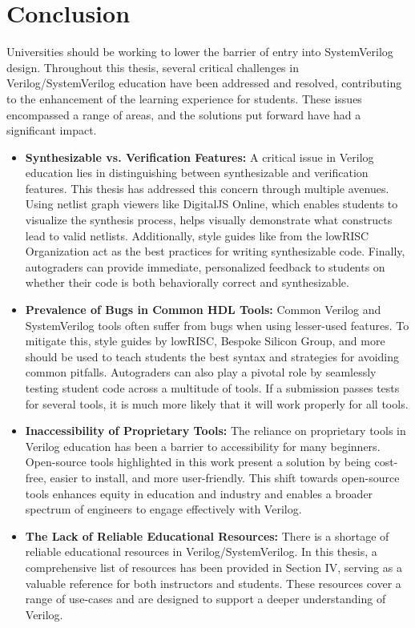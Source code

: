 
\chapter{Conclusion}
\label{chapter:Conclusion}

Universities should be working to lower the barrier of entry into SystemVerilog design. Throughout this thesis, several critical challenges in Verilog/SystemVerilog education have been addressed and resolved, contributing to the enhancement of the learning experience for students. These issues encompassed a range of areas, and the solutions put forward have had a significant impact.

\begin{itemize}
    \item \textbf{Synthesizable vs. Verification Features:} A critical issue in Verilog education lies in distinguishing between synthesizable and verification features. This thesis has addressed this concern through multiple avenues. Using netlist graph viewers like DigitalJS Online, which enables students to visualize the synthesis process, helps visually demonstrate what constructs lead to valid netlists. Additionally, style guides like from the lowRISC Organization act as the best practices for writing synthesizable code. Finally, autograders can provide immediate, personalized feedback to students on whether their code is both behaviorally correct and synthesizable.
    \item \textbf{Prevalence of Bugs in Common HDL Tools:} Common Verilog and SystemVerilog tools often suffer from bugs when using lesser-used features. To mitigate this, style guides by lowRISC, Bespoke Silicon Group, and more should be used to teach students the best syntax and strategies for avoiding common pitfalls. Autograders can also play a pivotal role by seamlessly testing student code across a multitude of tools. If a submission passes tests for several tools, it is much more likely that it will work properly for all tools.
    \item \textbf{Inaccessibility of Proprietary Tools:} The reliance on proprietary tools in Verilog education has been a barrier to accessibility for many beginners. Open-source tools highlighted in this work present a solution by being cost-free, easier to install, and more user-friendly. This shift towards open-source tools enhances equity in education and industry and enables a broader spectrum of engineers to engage effectively with Verilog.
    \item \textbf{The Lack of Reliable Educational Resources:} There is a shortage of reliable educational resources in Verilog/SystemVerilog. In this thesis, a comprehensive list of resources has been provided in Section IV, serving as a valuable reference for both instructors and students. These resources cover a range of use-cases and are designed to support a deeper understanding of Verilog.

\end{itemize}
